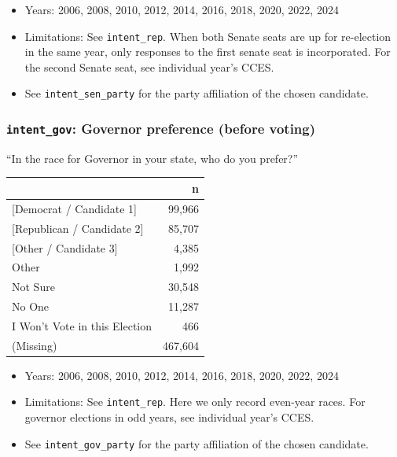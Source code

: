 \documentclass[10pt,article,oneside]{memoir}
\begin{document}
\begin{itemize}
\tightlist
\item
  Years: 2006, 2008, 2010, 2012, 2014, 2016, 2018, 2020, 2022, 2024
\item
  Limitations: See \texttt{intent\_rep}. When both Senate seats are up
  for re-election in the same year, only responses to the first senate
  seat is incorporated. For the second Senate seat, see individual
  year's CCES.
\item
  See \texttt{intent\_sen\_party} for the party affiliation of the
  chosen candidate.
\end{itemize}

\subsubsection{\texorpdfstring{\texttt{intent\_gov}: Governor preference
(before
voting)}{intent\_gov: Governor preference (before voting)}}\label{intent_gov-governor-preference-before-voting}

``In the race for Governor in your state, who do you prefer?''

\begin{table}[H]
\centering
\begin{tabular}[t]{lr}
\toprule
 & n\\
\midrule
{}{[Democrat / Candidate 1]} & 99,966\\
{}{[Republican / Candidate 2]} & 85,707\\
{}{[Other / Candidate 3]} & 4,385\\
Other & 1,992\\
Not Sure & 30,548\\
No One & 11,287\\
I Won't Vote in this Election & 466\\
(Missing) & 467,604\\
\bottomrule
\end{tabular}
\end{table}

\begin{itemize}
\tightlist
\item
  Years: 2006, 2008, 2010, 2012, 2014, 2016, 2018, 2020, 2022, 2024
\item
  Limitations: See \texttt{intent\_rep}. Here we only record even-year
  races. For governor elections in odd years, see individual year's
  CCES.
\item
  See \texttt{intent\_gov\_party} for the party affiliation of the
  chosen candidate.
\end{itemize}
\end{document}
